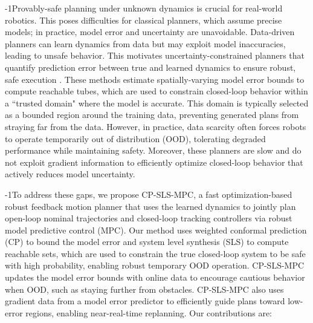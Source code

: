 \documentclass{l4dc2026}
\newcommand{\methodnospace}{CP-SLS-MPC}
\newcommand{\method}{CP-SLS-MPC }
\begin{document}
\looseness-1Provably-safe planning under unknown dynamics is crucial for real-world robotics. This poses difficulties for classical planners, which assume precise models; in practice, model error and uncertainty are unavoidable.
Data-driven planners can learn dynamics from data but may exploit model inaccuracies, leading to unsafe behavior. 
This motivates uncertainty-constrained planners that quantify prediction error between true and learned dynamics to ensure robust, safe execution \citep{DBLP:journals/ral/KnuthCOB21, DBLP:conf/icra/KnuthCRM23, wasiela2024learning}. 
These methods estimate spatially-varying model error bounds to compute reachable tubes, which are used to constrain closed-loop behavior within a ``trusted domain" where the model is accurate. This domain is typically selected as a bounded region around the training data, preventing generated plans from straying far from the data. However, in practice, data scarcity often forces robots to operate temporarily out of distribution (OOD), tolerating degraded performance while maintaining safety.
Moreover, these planners are slow and do not exploit gradient information to efficiently optimize closed-loop behavior that actively reduces model uncertainty.

\looseness-1To address these gaps, we propose \methodnospace, a fast optimization-based robust feedback motion planner that uses the learned dynamics to jointly plan open-loop nominal trajectories and closed-loop tracking controllers via robust model predictive control (MPC). Our method uses weighted conformal prediction (CP) to bound the model error and system level synthesis (SLS) \citep{anderson2019system} to compute reachable sets, which are used to constrain the true closed-loop system to be safe with high probability, enabling robust temporary OOD operation. \method updates the model error bounds with online data to encourage cautious behavior when OOD, such as staying further from obstacles. 
\method also uses gradient data from a model error predictor to efficiently guide plans toward low-error regions, enabling near-real-time replanning. 
Our contributions are:
\end{document}
